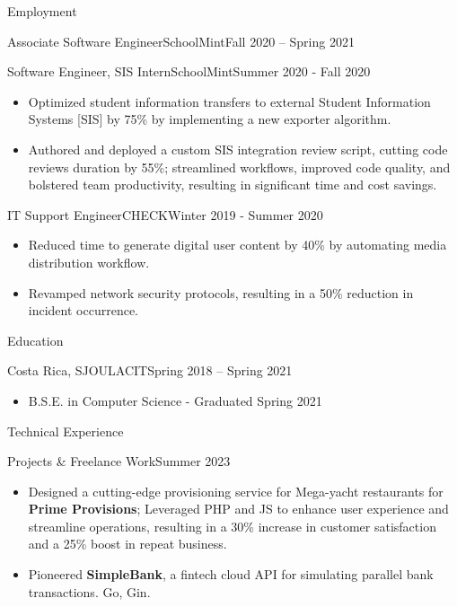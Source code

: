 \documentclass[]{mcdowellcv}
\begin{document}
\begin{cvsection}{Employment}
\begin{cvsubsection}{Associate Software Engineer}{SchoolMint}{Fall 2020 -- Spring 2021}
\begin{itemize}
			\end{itemize}
		\end{cvsubsection}
		\begin{cvsubsection}{Software Engineer, SIS Intern}{SchoolMint}{Summer 2020 - Fall 2020}
			\begin{itemize}
				\item Optimized student information transfers to external Student Information Systems [SIS] by 75\% by implementing a new exporter algorithm.
				\item Authored and deployed a custom SIS integration review script, cutting code reviews duration by 55\%; streamlined workflows, improved code quality, and bolstered team productivity, resulting in significant time and cost savings.
			\end{itemize}
		\end{cvsubsection}
		\begin{cvsubsection}{IT Support Engineer}{CHECK}{Winter 2019 - Summer 2020}
			\begin{itemize}
				\item Reduced time to generate digital user content by 40\% by automating media distribution workflow.
				\item Revamped network security protocols, resulting in a 50\% reduction in incident occurrence.
			\end{itemize}
		\end{cvsubsection}
	\end{cvsection}
	\begin{cvsection}{Education}
		\begin{cvsubsection}{Costa Rica, SJO}{ULACIT}{Spring 2018 -- Spring 2021}
			\begin{itemize}
				\item B.S.E. in Computer Science - Graduated Spring 2021
			\end{itemize}
		\end{cvsubsection}
	\end{cvsection}
	\begin{cvsection}{Technical Experience}
		\begin{cvsubsection}{Projects \& Freelance Work}{}{Summer 2023}
			\begin{itemize}
				\item Designed a cutting-edge provisioning service for Mega-yacht restaurants for \textbf{Prime Provisions}; Leveraged PHP and JS to enhance user experience and streamline operations, resulting in a 30\% increase in customer satisfaction and a 25\% boost in repeat business.
			\end{itemize}
			\begin{itemize}
				\item Pioneered \textbf{SimpleBank}, a fintech cloud API for simulating parallel bank transactions. Go, Gin.
			\end{itemize}
		\end{cvsubsection}
	\end{cvsection}
\end{document}
